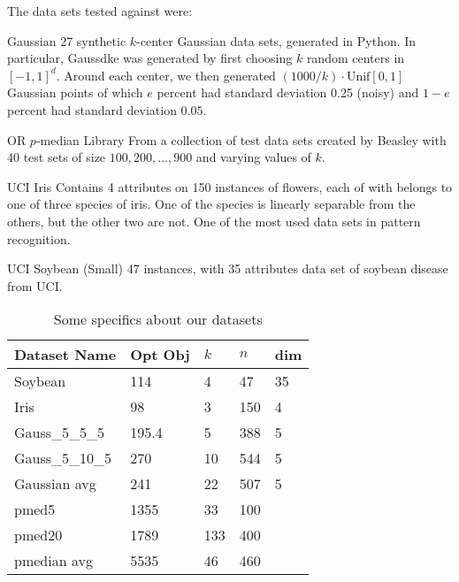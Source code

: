 \documentclass[conference, 10pt, final]{IEEEtran}
\begin{document}
The data sets tested against were:
\begin{LaTeXdescription}
\item[Gaussian] 27 synthetic $k$-center Gaussian data sets, generated in Python. In particular, Gauss\textunderscore d\textunderscore k\textunderscore e was generated by first choosing $k$ random centers in $[-1,1]^d$. Around each center, we then generated $(1000/k) \cdot \mathrm{Unif}[0,1]$ Gaussian points of which $e$ percent had standard deviation 0.25 (noisy) and $1-e$ percent had standard deviation $0.05$. 
\item[OR $p$-median Library] \cite{Beasley} From a collection of test data sets created by Beasley with 40 test sets of size $100, 200, \ldots, 900$ and varying values of $k$. 
\item[UCI Iris] \cite{Iris} Contains 4 attributes on 150 instances of flowers, each of with belongs to one of three species of iris.  One of the species is linearly separable from the others, but the other two are not.  One of the most used data sets in pattern recognition.
\item[UCI Soybean (Small)] \cite{Soybean} 47 instances, with 35 attributes data set of soybean disease from UCI.
\end{LaTeXdescription} 

\begin{table}[!t]
\caption{Some specifics about our datasets}
\label{table_specifics}
\centering
\begin{tabular}{ | l | l | l | l | l | }
\hline
 Dataset Name & Opt Obj & $k$ & $n$ & dim \\ \hline
Soybean & 114 & 4 & 47 & 35 \\ 
Iris & 98 & 3 & 150 & 4 \\ 
Gauss\_5\_5\_5 & 195.4 & 5 & 388 & 5 \\ 
Gauss\_5\_10\_5 & 270 & 10 & 544 & 5 \\ 
Gaussian avg & 241 & 22 & 507 & 5 \\ 
pmed5 & 1355 & 33 & 100 & \  \\ 
pmed20 & 1789 & 133 & 400 & \  \\ 
pmedian avg & 5535 & 46 & 460 & \  \\ \hline
 \end{tabular}
\end{table}
\end{document}
